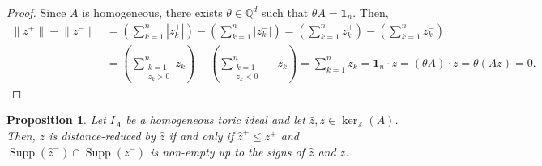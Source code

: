 \documentclass[a4paper, 12pt]{article}
\newcommand{\QQ}{\mathbb Q}
\newcommand{\ZZ}{\mathbb Z}
\theoremstyle{plain}
\newtheorem{proposition}[theorem]{Proposition}
\theoremstyle{definition}
\theoremstyle{remark}
\begin{document}
\begin{proof}
    Since $A$ is homogeneous, there exists $\theta \in \QQ^d$ such that $\theta A = \mathbf{1}_n$. Then, 
    \begin{align*}
        \lVert z^+ \rVert - \lVert z^- \rVert&= \left(\sum_{k=1}^n |z^+_k| \right)-\left(\sum_{k=1}^n |z^-_k| \right)=\left(\sum_{k=1}^n z^+_k \right)-\left(\sum_{k=1}^n z^-_k \right) \\
        &=\left(\sum_{\substack{k=1 \\ z_k>0}}^n z_k \right)-\left(\sum_{\substack{k=1 \\ z_k<0}}^n -z_k \right)=\sum_{k=1}^n z_k=\mathbf{1}_n \cdot z 
        =(\theta A) \cdot z = \theta (Az)=0.
    \end{align*}
\end{proof}

\begin{proposition} \label{prop:drredef}
    Let $I_A$ be a homogeneous toric ideal and let $\hat z,z \in \ker_\ZZ(A)$. Then, $z$ is distance-reduced by $\hat z$ if and only if $\hat z^+ \le z^+$ and $\operatorname{Supp}(\hat z^-) \cap \operatorname{Supp}(z^-)$ is non-empty up to the signs of $\hat z$ and $z$.
\end{proposition}
\end{document}

